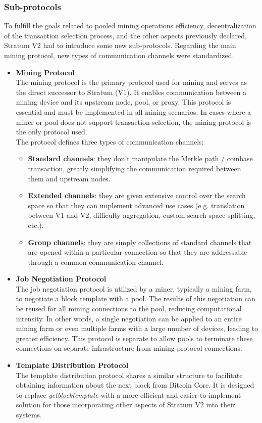 \subsubsection{Sub-protocols}
To fulfill the goals related to pooled mining operations efficiency, decentralization of the transaction selection process, and the other aspects previously declared, Stratum V2 had to introduce some new sub-protocols. Regarding the main mining protocol, new types of communication channels were standardized.

\begin{itemize}
    \item \textbf{Mining Protocol} \\The mining protocol is the primary protocol used for mining and serves as the direct successor to Stratum (V1). It enables communication between a mining device and its upstream node, pool, or proxy. This protocol is essential and must be implemented in all mining scenarios. In cases where a miner or pool does not support transaction selection, the mining protocol is the only protocol used.\\
    The protocol defines three types of communication channels:
    \begin{itemize}\label{channels}
        \item \textbf{Standard channels}\label{sssec:sv2_hom}: they don't manipulate the Merkle path / coinbase transaction, greatly simplifying the communication required between them and upstream nodes.
        \item \textbf{Extended channels}: they are given extensive control over the search space so that they can implement advanced use cases (e.g. translation between V1 and V2, difficulty aggregation, custom search space splitting, etc.).
        \item \textbf{Group channels}: they are simply collections of standard channels that are opened within a particular connection so that they are addressable through a common communication channel.
    \end{itemize}
    
    \item \textbf{Job Negotiation Protocol} \\ The job negotiation protocol is utilized by a miner, typically a mining farm, to negotiate a block template with a pool. The results of this negotiation can be reused for all mining connections to the pool, reducing computational intensity. In other words, a single negotiation can be applied to an entire mining farm or even multiple farms with a large number of devices, leading to greater efficiency. This protocol is separate to allow pools to terminate these connections on separate infrastructure from mining protocol connections.
    \item \textbf{Template Distribution Protocol} \\ The template distribution protocol shares a similar structure to facilitate obtaining information about the next block from Bitcoin Core. It is designed to replace \textit{getblocktemplate} with a more efficient and easier-to-implement solution for those incorporating other aspects of Stratum V2 into their systems.
\end{itemize}

